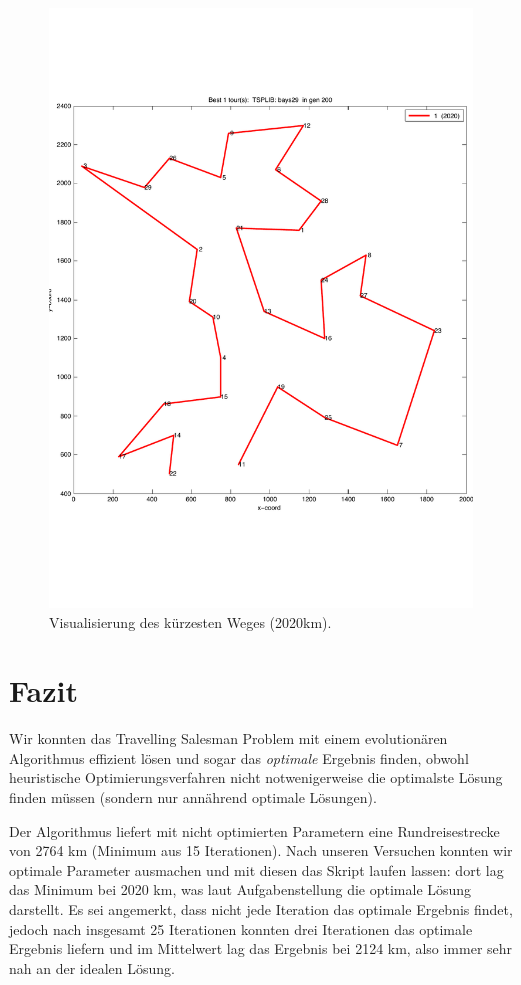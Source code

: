 \begin{figure}[!h] \centering
  \includegraphics[width=1.0\textwidth]{Figures/path.pdf}
  \caption{Visualisierung des kürzesten Weges (2020km).}
  \label{fig.optPath}
\end{figure}



\section{Fazit}\label{conclusion}

Wir konnten das Travelling Salesman Problem
mit einem evolutionären Algorithmus effizient lösen
und sogar das \emph{optimale} Ergebnis finden, obwohl heuristische
Optimierungsverfahren nicht notwenigerweise die optimalste Lösung finden müssen
(sondern nur annährend optimale Lösungen).

Der Algorithmus liefert mit nicht optimierten Parametern eine Rundreisestrecke
von 2764 km (Minimum aus 15 Iterationen).
Nach unseren Versuchen konnten wir optimale Parameter ausmachen und mit diesen
das Skript laufen lassen: dort lag das Minimum bei 2020 km, was laut Aufgabenstellung
die optimale Lösung darstellt.
Es sei angemerkt, dass nicht jede Iteration das optimale Ergebnis findet,
jedoch nach insgesamt 25 Iterationen konnten drei Iterationen das optimale
Ergebnis liefern und im Mittelwert lag das Ergebnis bei 2124 km,
also immer sehr nah an der idealen Lösung.

